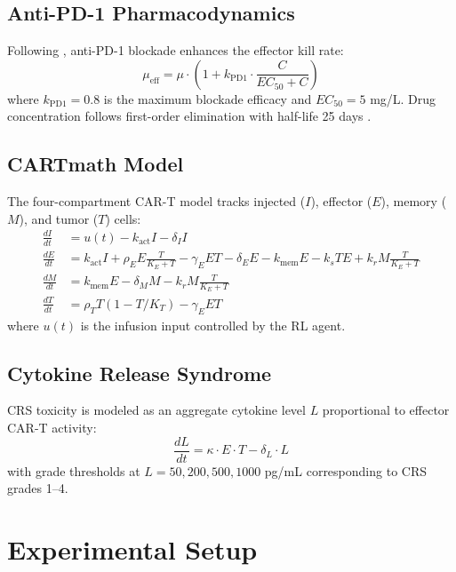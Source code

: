 \documentclass[11pt,a4paper]{article}
\begin{document}
\subsection{Anti-PD-1 Pharmacodynamics}

Following \citet{Nikolopoulou2018}, anti-PD-1 blockade enhances the effector kill rate:
\begin{equation}
    \mu_{\text{eff}} = \mu \cdot (1 + k_{\text{PD1}} \cdot \frac{C}{EC_{50} + C})
\end{equation}
where $k_{\text{PD1}} = 0.8$ is the maximum blockade efficacy and $EC_{50} = 5$ mg/L. Drug concentration follows first-order elimination with half-life 25 days \citep{Bajaj2017}.

\subsection{CARTmath Model}

The four-compartment CAR-T model \citep{Barros2021} tracks injected ($I$), effector ($E$), memory ($M$), and tumor ($T$) cells:
\begin{align}
    \frac{dI}{dt} &= u(t) - k_{\text{act}} I - \delta_I I \\
    \frac{dE}{dt} &= k_{\text{act}} I + \rho_E E \frac{T}{K_E + T} - \gamma_E E T - \delta_E E - k_{\text{mem}} E - k_s T E + k_r M \frac{T}{K_E + T} \\
    \frac{dM}{dt} &= k_{\text{mem}} E - \delta_M M - k_r M \frac{T}{K_E + T} \\
    \frac{dT}{dt} &= \rho_T T (1 - T/K_T) - \gamma_E E T
\end{align}
where $u(t)$ is the infusion input controlled by the RL agent.

\subsection{Cytokine Release Syndrome}

CRS toxicity \citep{Santurio2025} is modeled as an aggregate cytokine level $L$ proportional to effector CAR-T activity:
\begin{equation}
    \frac{dL}{dt} = \kappa \cdot E \cdot T - \delta_L \cdot L
\end{equation}
with grade thresholds at $L = 50, 200, 500, 1000$ pg/mL corresponding to CRS grades 1--4.

\section{Experimental Setup}
\end{document}

